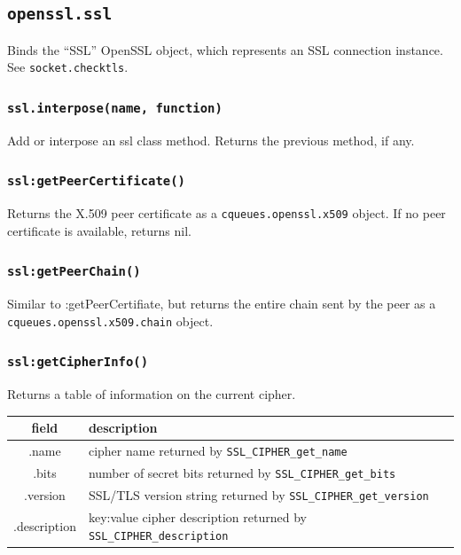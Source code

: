 \documentclass[11pt, oneside]{memoir}
\newcommand*{\fn}[1]{\texttt{#1}\xspace}
\newcommand*{\method}[1]{\texttt{#1}\xspace}
\newcommand*{\module}[1]{\texttt{#1}\xspace}
\newcounter{toccols}
\newenvironment{Module}[1]{
	\subsection{\texttt{#1}}
	\addtocontents{toc}{
		\protect\begin{multicols}{\value{toccols}}
	}
}{
	\addtocontents{toc}{\protect\end{multicols}}
}
\begin{document}
\begin{Module}{openssl.ssl}

Binds the ``SSL'' OpenSSL object, which represents an SSL connection instance. See \method{socket.checktls}.

\subsubsection[\fn{ssl.interpose}]{\fn{ssl.interpose(name, function)}}

Add or interpose an ssl class method. Returns the previous method, if any.

\subsubsection[\fn{ssl:getPeerCertificate}]{\fn{ssl:getPeerCertificate()}}

Returns the X.509 peer certificate as a \module{cqueues.openssl.x509} object. If no peer certificate is available, returns nil.

\subsubsection[\fn{ssl:getPeerChain}]{\fn{ssl:getPeerChain()}}

Similar to :getPeerCertifiate, but returns the entire chain sent by the peer as a \module{cqueues.openssl.x509.chain} object.

\subsubsection[\fn{ssl:getCipherInfo}]{\fn{ssl:getCipherInfo()}}

Returns a table of information on the current cipher. 

\begin{tabular}{ c | l }
field & description\\\hline
.name & cipher name returned by \fn{SSL\_CIPHER\_get\_name}\\
.bits & number of secret bits returned by \fn{SSL\_CIPHER\_get\_bits}\\
.version & SSL/TLS version string returned by \fn{SSL\_CIPHER\_get\_version}\\
.description & key:value cipher description returned by \fn{SSL\_CIPHER\_description}
\end{tabular}

\end{Module}
\end{document}
